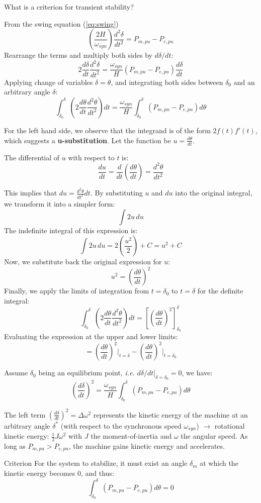 \begin{frame}[allowframebreaks]{What is a criterion for transient stability?}

From the swing equation (\ref{eq:swing})
$$\left(\frac{2H}{\omega_{syn}}\right) \frac{d^2\delta}{dt^2} = P_{m,pu} - P_{e,pu}$$
Rearrange the terms and multiply both sides by $d\delta/dt$:
$$2\frac{d\delta}{dt}\frac{d^2\delta}{dt^2} = \frac{\omega_{syn}}{H}\left(P_{m,pu}-P_{e,pu}\right)\frac{d\delta}{dt}$$
Applying change of variables $\delta = \theta$, and integrating both sides between $\delta_0$ and an arbitrary angle $\delta$:
$$\int_{\delta_0}^{\delta} \left(2\frac{d\theta}{dt}\frac{d^2\theta}{dt^2}\right) dt = \frac{\omega_{syn}}{H}\int_{\delta_0}^{\delta} \left(P_{m,pu}-P_{e,pu}\right)d\theta$$


For the left hand side, we observe that the integrand is of the form $2f(t)f'(t)$, which suggests a \textbf{u-substitution}.
Let the function be $u = \frac{d\theta}{dt}$.

The differential of $u$ with respect to $t$ is:
$$ \frac{du}{dt} = \frac{d}{dt}\left(\frac{d\theta}{dt}\right) = \frac{d^2\theta}{dt^2} $$

This implies that $ du = \frac{d^2\theta}{dt^2} dt $.
By substituting $u$ and $du$ into the original integral, we transform it into a simpler form:
$$ \int 2u \, du $$
The indefinite integral of this expression is:
$$ \int 2u \, du = 2\left(\frac{u^2}{2}\right) + C = u^2 + C $$
Now, we substitute back the original expression for $u$:
$$ u^2 = \left(\frac{d\theta}{dt}\right)^2 $$
Finally, we apply the limits of integration from $t = \delta_0$ to $t = \delta$ for the definite integral:
$$ \int_{\delta_0}^{\delta} \left(2\frac{d\theta}{dt}\frac{d^2\theta}{dt^2}\right) dt = \left[\left(\frac{d\theta}{dt}\right)^2\right]_{\delta_0}^{\delta} $$
Evaluating the expression at the upper and lower limits:
$$ = \left(\frac{d\theta}{dt}\right)^2\bigg|_{t=\delta} - \left(\frac{d\theta}{dt}\right)^2\bigg|_{t=\delta_0} $$


Assume $\delta_0$ being an equilibrium point, \emph{i.e.} $d\delta/dt|_{\delta = \delta_0} = 0$, we have:
$$\left(\frac{d\delta}{dt}\right)^2 = \frac{\omega_{syn}}{H}\int_{\delta_0}^{\delta} \left(P_{m,pu}-P_{e,pu}\right) d\theta$$


The left term $\left(\frac{d\delta}{dt}\right)^2 = \Delta\omega^2$ represents the kinetic energy of the machine at an arbitrary angle $\delta^*$ 
(with respect to the synchronous speed $\omega_{syn}$) $\rightarrow$ rotational kinetic energy: $\frac{1}{2} J \omega^2$ with $J$ the moment-of-inertia and $\omega$ the angular speed.
As long as $P_{m,pu} > P_{e,pu}$, the machine gains kinetic energy and accelerates. 

\begin{block}{Criterion}
For the system to stabilize, it must exist an angle $\delta_{m}$ at which the kinetic energy becomes 0, and thus:
$$\int_{\delta_0}^{\delta} \left(P_{m,pu}-P_{e,pu}\right) d\theta = 0$$    
\end{block}

\end{frame}

